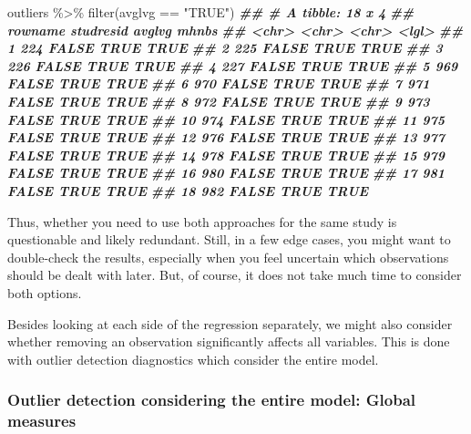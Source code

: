 \documentclass[
]{book}
\newenvironment{Shaded}{\begin{snugshade}}{\end{snugshade}}
\newcommand{\DocumentationTok}[1]{\textcolor[rgb]{0.56,0.35,0.01}{\textbf{\textit{#1}}}}
\newcommand{\FunctionTok}[1]{\textcolor[rgb]{0.00,0.00,0.00}{#1}}
\newcommand{\NormalTok}[1]{#1}
\newcommand{\SpecialCharTok}[1]{\textcolor[rgb]{0.00,0.00,0.00}{#1}}
\newcommand{\StringTok}[1]{\textcolor[rgb]{0.31,0.60,0.02}{#1}}
\begin{document}
\begin{Shaded}
\begin{Highlighting}[]
\NormalTok{outliers }\SpecialCharTok{\%\textgreater{}\%} \FunctionTok{filter}\NormalTok{(avglvg }\SpecialCharTok{==} \StringTok{"TRUE"}\NormalTok{)}
\DocumentationTok{\#\# \# A tibble: 18 x 4}
\DocumentationTok{\#\#    rowname studresid avglvg mhnbs}
\DocumentationTok{\#\#    \textless{}chr\textgreater{}   \textless{}chr\textgreater{}     \textless{}chr\textgreater{}  \textless{}lgl\textgreater{}}
\DocumentationTok{\#\#  1 224     FALSE     TRUE   TRUE }
\DocumentationTok{\#\#  2 225     FALSE     TRUE   TRUE }
\DocumentationTok{\#\#  3 226     FALSE     TRUE   TRUE }
\DocumentationTok{\#\#  4 227     FALSE     TRUE   TRUE }
\DocumentationTok{\#\#  5 969     FALSE     TRUE   TRUE }
\DocumentationTok{\#\#  6 970     FALSE     TRUE   TRUE }
\DocumentationTok{\#\#  7 971     FALSE     TRUE   TRUE }
\DocumentationTok{\#\#  8 972     FALSE     TRUE   TRUE }
\DocumentationTok{\#\#  9 973     FALSE     TRUE   TRUE }
\DocumentationTok{\#\# 10 974     FALSE     TRUE   TRUE }
\DocumentationTok{\#\# 11 975     FALSE     TRUE   TRUE }
\DocumentationTok{\#\# 12 976     FALSE     TRUE   TRUE }
\DocumentationTok{\#\# 13 977     FALSE     TRUE   TRUE }
\DocumentationTok{\#\# 14 978     FALSE     TRUE   TRUE }
\DocumentationTok{\#\# 15 979     FALSE     TRUE   TRUE }
\DocumentationTok{\#\# 16 980     FALSE     TRUE   TRUE }
\DocumentationTok{\#\# 17 981     FALSE     TRUE   TRUE }
\DocumentationTok{\#\# 18 982     FALSE     TRUE   TRUE}
\end{Highlighting}
\end{Shaded}

Thus, whether you need to use both approaches for the same study is questionable and likely redundant. Still, in a few edge cases, you might want to double-check the results, especially when you feel uncertain which observations should be dealt with later. But, of course, it does not take much time to consider both options.

Besides looking at each side of the regression separately, we might also consider whether removing an observation significantly affects all variables. This is done with outlier detection diagnostics which consider the entire model.

\hypertarget{outlier-detection-global-measures}{%
\subsubsection{Outlier detection considering the entire model: Global measures}\label{outlier-detection-global-measures}}
\end{document}
